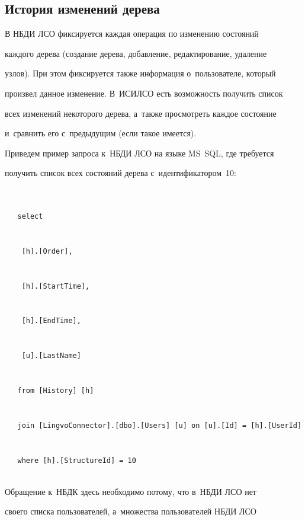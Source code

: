   


  \subsection{История изменений дерева}


  


  В НБДИ ЛСО фиксируется каж\-дая операция по изменению состояний 


каж\-до\-го дерева (создание дерева, добавление, редактирование, удаление 


узлов). При этом фиксируется также информация о~пользователе, который 


произвел данное изменение. В~ИСИЛСО есть возможность получить список 


всех изменений некоторого дерева, а~также просмотреть каж\-дое состояние 


и~сравнить его с~предыдущим (если такое имеется).


  


  Приведем пример запроса к~НБДИ ЛСО на языке MS~SQL, где требуется 


получить список всех состояний дерева с~идентификатором~10:





\noindent


{\small   \begin{verbatim}


   select   


    [h].[Order],        


    [h].[StartTime],        


    [h].[EndTime],      


    [u].[LastName]      


   from [History] [h]


   join [LingvoConnector].[dbo].[Users] [u] on [u].[Id] = [h].[UserId]


   where [h].[StructureId] = 10


   \end{verbatim}


   }


   


  


  Обращение к~НБДК здесь необходимо потому, что в~НБДИ ЛСО нет 


своего списка пользователей, а~множества пользователей НБДИ ЛСО 


